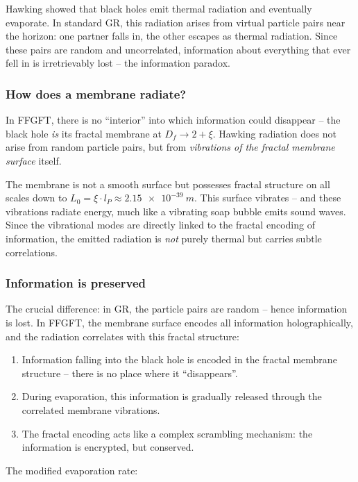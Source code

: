 Hawking showed that black holes emit thermal radiation and eventually evaporate. In standard GR, this radiation arises from virtual particle pairs near the horizon: one partner falls in, the other escapes as thermal radiation. Since these pairs are random and uncorrelated, information about everything that ever fell in is irretrievably lost -- the information paradox.

\subsubsection{How does a membrane radiate?}

In FFGFT, there is no ``interior'' into which information could disappear -- the black hole \textit{is} its fractal membrane at $D_f \to 2 + \xi$. Hawking radiation does not arise from random particle pairs, but from \textit{vibrations of the fractal membrane surface} itself.

The membrane is not a smooth surface but possesses fractal structure on all scales down to $L_0 = \xi \cdot l_P \approx \SI{2.15e-39}{m}$. This surface vibrates -- and these vibrations radiate energy, much like a vibrating soap bubble emits sound waves. Since the vibrational modes are directly linked to the fractal encoding of information, the emitted radiation is \textit{not} purely thermal but carries subtle correlations.

\subsubsection{Information is preserved}

The crucial difference: in GR, the particle pairs are random -- hence information is lost. In FFGFT, the membrane surface encodes all information holographically, and the radiation correlates with this fractal structure:

\begin{enumerate}
\item Information falling into the black hole is encoded in the fractal membrane structure -- there is no place where it ``disappears''.
\item During evaporation, this information is gradually released through the correlated membrane vibrations.
\item The fractal encoding acts like a complex scrambling mechanism: the information is encrypted, but conserved.
\end{enumerate}

The modified evaporation rate:

